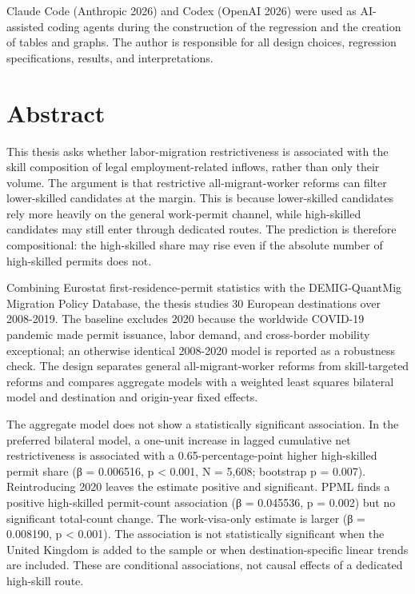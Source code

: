 \documentclass[11pt,a4paper]{article}
\begin{document}
Claude Code (Anthropic 2026) and Codex (OpenAI 2026) were used as
AI-assisted coding agents during the construction of the regression and
the creation of tables and graphs. The author is responsible for all
design choices, regression specifications, results, and interpretations.

\clearpage\section*{Abstract}\label{abstract}

This thesis asks whether labor-migration restrictiveness is associated
with the skill composition of legal employment-related inflows, rather
than only their volume. The argument is that restrictive
all-migrant-worker reforms can filter lower-skilled candidates at the
margin. This is because lower-skilled candidates rely more heavily on
the general work-permit channel, while high-skilled candidates may still
enter through dedicated routes. The prediction is therefore
compositional: the high-skilled share may rise even if the absolute
number of high-skilled permits does not.

Combining Eurostat first-residence-permit statistics with the
DEMIG-QuantMig Migration Policy Database, the thesis studies 30 European
destinations over 2008-2019. The baseline excludes 2020 because the
worldwide COVID-19 pandemic made permit issuance, labor demand, and
cross-border mobility exceptional; an otherwise identical 2008-2020
model is reported as a robustness check. The design separates general
all-migrant-worker reforms from skill-targeted reforms and compares
aggregate models with a weighted least squares bilateral model and
destination and origin-year fixed effects.

The aggregate model does not show a statistically significant
association. In the preferred bilateral model, a one-unit increase in
lagged cumulative net restrictiveness is associated with a
0.65-percentage-point higher high-skilled permit share (β = 0.006516, p
\textless{} 0.001, N = 5,608; bootstrap p = 0.007). Reintroducing 2020
leaves the estimate positive and significant. PPML finds a positive
high-skilled permit-count association (β = 0.045536, p = 0.002) but no
significant total-count change. The work-visa-only estimate is larger (β
= 0.008190, p \textless{} 0.001). The association is not statistically
significant when the United Kingdom is added to the sample or when
destination-specific linear trends are included. These are conditional
associations, not causal effects of a dedicated high-skill route.
\end{document}
